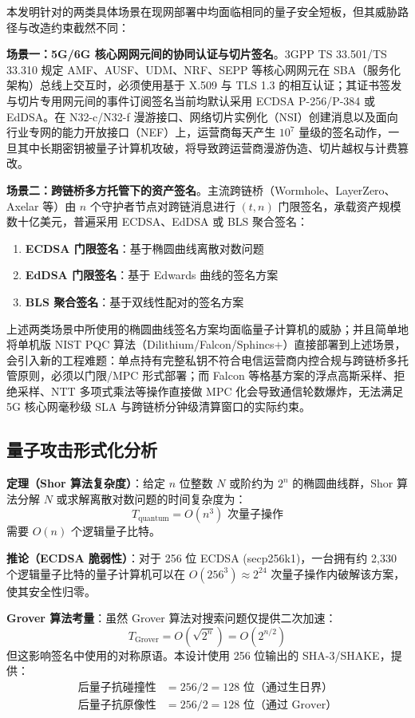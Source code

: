 \documentclass[12pt,a4paper]{article}
\begin{document}
本发明针对的两类具体场景在现网部署中均面临相同的量子安全短板，但其威胁路径与改造约束截然不同：

\textbf{场景一：5G/6G 核心网网元间的协同认证与切片签名}。3GPP TS 33.501/TS 33.310 规定 AMF、AUSF、UDM、NRF、SEPP 等核心网网元在 SBA（服务化架构）总线上交互时，必须使用基于 X.509 与 TLS 1.3 的相互认证；其证书签发与切片专用网元间的事件订阅签名当前均默认采用 ECDSA P-256/P-384 或 EdDSA。在 N32-c/N32-f 漫游接口、网络切片实例化（NSI）创建消息以及面向行业专网的能力开放接口（NEF）上，运营商每天产生 $10^7$ 量级的签名动作，一旦其中长期密钥被量子计算机攻破，将导致跨运营商漫游伪造、切片越权与计费篡改。

\textbf{场景二：跨链桥多方托管下的资产签名}。主流跨链桥（Wormhole、LayerZero、Axelar 等）由 $n$ 个守护者节点对跨链消息进行 $(t,n)$ 门限签名，承载资产规模数十亿美元，普遍采用 ECDSA、EdDSA 或 BLS 聚合签名：

\begin{enumerate}
    \item \textbf{ECDSA 门限签名}：基于椭圆曲线离散对数问题
    \item \textbf{EdDSA 门限签名}：基于 Edwards 曲线的签名方案
    \item \textbf{BLS 聚合签名}：基于双线性配对的签名方案
\end{enumerate}

上述两类场景中所使用的椭圆曲线签名方案均面临量子计算机的威胁；并且简单地将单机版 NIST PQC 算法（Dilithium/Falcon/Sphincs+）直接部署到上述场景，会引入新的工程难题：单点持有完整私钥不符合电信运营商内控合规与跨链桥多托管原则，必须以门限/MPC 形式部署；而 Falcon 等格基方案的浮点高斯采样、拒绝采样、NTT 多项式乘法等操作直接做 MPC 化会导致通信轮数爆炸，无法满足 5G 核心网毫秒级 SLA 与跨链桥分钟级清算窗口的实际约束。

\subsection{量子攻击形式化分析}

\textbf{定理（Shor 算法复杂度）}：给定 $n$ 位整数 $N$ 或阶约为 $2^n$ 的椭圆曲线群，Shor 算法分解 $N$ 或求解离散对数问题的时间复杂度为：
$$T_{\text{quantum}} = O(n^3) \text{ 次量子操作}$$
需要 $O(n)$ 个逻辑量子比特。

\textbf{推论（ECDSA 脆弱性）}：对于 256 位 ECDSA (secp256k1)，一台拥有约 2,330 个逻辑量子比特的量子计算机可以在 $O(256^3) \approx 2^{24}$ 次量子操作内破解该方案，使其安全性归零。

\textbf{Grover 算法考量}：虽然 Grover 算法对搜索问题仅提供二次加速：
$$T_{\text{Grover}} = O(\sqrt{2^n}) = O(2^{n/2})$$
但这影响签名中使用的对称原语。本设计使用 256 位输出的 SHA-3/SHAKE，提供：
\begin{align}
\text{后量子抗碰撞性} &= 256/2 = 128 \text{ 位（通过生日界）} \\
\text{后量子抗原像性} &= 256/2 = 128 \text{ 位（通过 Grover）}
\end{align}
\end{document}
